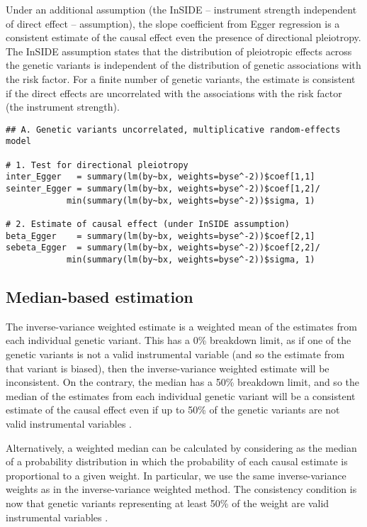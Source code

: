\documentclass[a4paper,12pt]{article} %
\begin{document}
Under an additional assumption (the InSIDE -- instrument strength independent of direct effect -- assumption), the slope coefficient from Egger regression is a consistent estimate of the causal effect even the presence of directional pleiotropy. The InSIDE assumption states that the distribution of pleiotropic effects across the genetic variants is independent of the distribution of genetic associations with the risk factor. For a finite number of genetic variants, the estimate is consistent if the direct effects are uncorrelated with the associations with the risk factor (the instrument strength).

\begin{lstlisting}
## A. Genetic variants uncorrelated, multiplicative random-effects model

# 1. Test for directional pleiotropy
inter_Egger   = summary(lm(by~bx, weights=byse^-2))$coef[1,1]
seinter_Egger = summary(lm(by~bx, weights=byse^-2))$coef[1,2]/
            min(summary(lm(by~bx, weights=byse^-2))$sigma, 1)

# 2. Estimate of causal effect (under InSIDE assumption)
beta_Egger    = summary(lm(by~bx, weights=byse^-2))$coef[2,1]
sebeta_Egger  = summary(lm(by~bx, weights=byse^-2))$coef[2,2]/
            min(summary(lm(by~bx, weights=byse^-2))$sigma, 1)
\end{lstlisting}

\clearpage

\subsection{Median-based estimation}
The inverse-variance weighted estimate is a weighted mean of the estimates from each individual genetic variant. This has a 0\% breakdown limit, as if one of the genetic variants is not a valid instrumental variable (and so the estimate from that variant is biased), then the inverse-variance weighted estimate will be inconsistent. On the contrary, the median has a 50\% breakdown limit, and so the median of the estimates from each individual genetic variant will be a consistent estimate of the causal effect even if up to 50\% of the genetic variants are not valid instrumental variables \citep{han2008}.

Alternatively, a weighted median can be calculated by considering as the median of a probability distribution in which the probability of each causal estimate is proportional to a given weight. In particular, we use the same inverse-variance weights as in the inverse-variance weighted method. The consistency condition is now that genetic variants representing at least 50\% of the weight are valid instrumental variables \citep{bowden2015median}.
\end{document}
